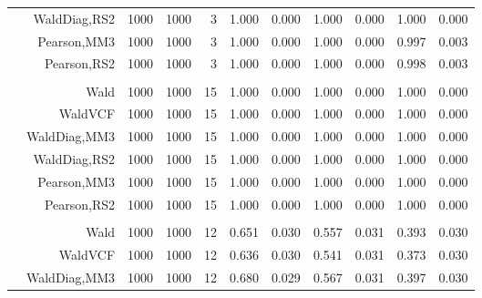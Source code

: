 \documentclass[
]{article}
\begin{document}
\begin{table}[H]
{\begin{tabular}[t]{lrrrrrrrlrr}
\hspace{1em} & WaldDiag,RS2 & 1000 & 1000 & 3 & 1.000 & 0.000 & 1.000 & 0.000 & 1.000 & 0.000\\

\hspace{1em} & Pearson,MM3 & 1000 & 1000 & 3 & 1.000 & 0.000 & 1.000 & 0.000 & 0.997 & 0.003\\

\hspace{1em} & Pearson,RS2 & 1000 & 1000 & 3 & 1.000 & 0.000 & 1.000 & 0.000 & 0.998 & 0.003\\
\cmidrule{1-11}
\addlinespace[0.3em]
\multicolumn{11}{l}{\textbf{1F 15V}}\\
\hspace{1em} & Wald & 1000 & 1000 & 15 & 1.000 & 0.000 & 1.000 & 0.000 & 1.000 & 0.000\\

\hspace{1em} & WaldVCF & 1000 & 1000 & 15 & 1.000 & 0.000 & 1.000 & 0.000 & 1.000 & 0.000\\

\hspace{1em} & WaldDiag,MM3 & 1000 & 1000 & 15 & 1.000 & 0.000 & 1.000 & 0.000 & 1.000 & 0.000\\

\hspace{1em} & WaldDiag,RS2 & 1000 & 1000 & 15 & 1.000 & 0.000 & 1.000 & 0.000 & 1.000 & 0.000\\

\hspace{1em} & Pearson,MM3 & 1000 & 1000 & 15 & 1.000 & 0.000 & 1.000 & 0.000 & 1.000 & 0.000\\

\hspace{1em} & Pearson,RS2 & 1000 & 1000 & 15 & 1.000 & 0.000 & 1.000 & 0.000 & 1.000 & 0.000\\
\cmidrule{1-11}
\addlinespace[0.3em]
\multicolumn{11}{l}{\textbf{2F 10V}}\\
\hspace{1em} & Wald & 1000 & 1000 & 12 & 0.651 & 0.030 & 0.557 & 0.031 & 0.393 & 0.030\\

\hspace{1em} & WaldVCF & 1000 & 1000 & 12 & 0.636 & 0.030 & 0.541 & 0.031 & 0.373 & 0.030\\

\hspace{1em} & WaldDiag,MM3 & 1000 & 1000 & 12 & 0.680 & 0.029 & 0.567 & 0.031 & 0.397 & 0.030\\


\end{tabular}}
\end{table}
\end{document}
